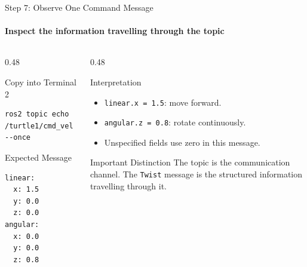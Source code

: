 

\begin{frame}[fragile]{Step 7: Observe One Command Message}
\framesubtitle{Inspect the information travelling through the topic}

\footnotesize

\begin{columns}[T,onlytextwidth]

    \begin{column}{0.48\textwidth}
        \begin{block}{Copy into Terminal 2}
\begin{verbatim}
ros2 topic echo /turtle1/cmd_vel --once
\end{verbatim}
        \end{block}

        \begin{exampleblock}{Expected Message}
\begin{verbatim}
linear:
  x: 1.5
  y: 0.0
  z: 0.0
angular:
  x: 0.0
  y: 0.0
  z: 0.8
\end{verbatim}
        \end{exampleblock}
    \end{column}

    \begin{column}{0.48\textwidth}
        \begin{block}{Interpretation}
            \begin{itemize}
                \setlength{\itemsep}{0.18em}
                \item \texttt{linear.x = 1.5}: move forward.
                \item \texttt{angular.z = 0.8}: rotate continuously.
                \item Unspecified fields use zero in this message.
            \end{itemize}
        \end{block}

        \vspace{0.15cm}

        \begin{alertblock}{Important Distinction}
            The topic is the communication channel. The \texttt{Twist} message
            is the structured information travelling through it.
        \end{alertblock}
    \end{column}

\end{columns}

\end{frame}

